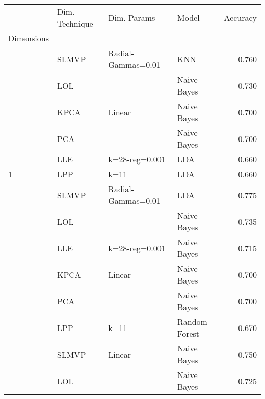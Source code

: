 \begin{table}
    \begin{tabular}{llllr}
        \toprule
        {}                                       & Dim. Technique & Dim. Params        & Model         & Accuracy \\
        Dimensions                               &                &                    &               &          \\
        \midrule
                                                 & SLMVP          & Radial-Gammas=0.01 & KNN           & 0.760    \\
                                                 & LOL            &                    & Naive Bayes   & 0.730    \\
                                                 & KPCA           & Linear             & Naive Bayes   & 0.700    \\
                                                 & PCA            &                    & Naive Bayes   & 0.700    \\
                                                 & LLE            & k=28-reg=0.001     & LDA           & 0.660    \\
        \multirow{-6}{*}{1}                      & LPP            & k=11               & LDA           & 0.660    \\
        \rowcolor{lightgray}                     & SLMVP          & Radial-Gammas=0.01 & LDA           & 0.775    \\
        \rowcolor{lightgray}                     & LOL            &                    & Naive Bayes   & 0.735    \\
        \rowcolor{lightgray}                     & LLE            & k=28-reg=0.001     & Naive Bayes   & 0.715    \\
        \rowcolor{lightgray}                     & KPCA           & Linear             & Naive Bayes   & 0.700    \\
        \rowcolor{lightgray}                     & PCA            &                    & Naive Bayes   & 0.700    \\
        \rowcolor{lightgray}\multirow{-6}{*}{3}  & LPP            & k=11               & Random Forest & 0.670    \\
                                                 & SLMVP          & Linear             & Naive Bayes   & 0.750    \\
                                                 & LOL            &                    & Naive Bayes   & 0.725    \\

\end{tabular}
\end{table}
